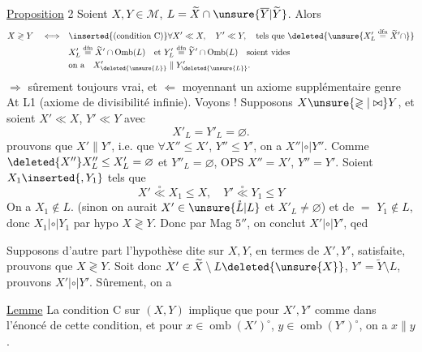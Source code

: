 \uline{Proposition} 2  Soient $X,Y\in\mathcal M$, $L=\widetilde X\cap\unsure{\overline Y|\widetilde Y}$.  Alors
\[
\begin{aligned}
X\gtrless Y\quad\Longleftrightarrow\quad&\inserted{\text{(condition C)}}\forall X'\ll X,\quad Y'\ll Y,\quad\text{tels que }\deleted{\unsure{X'_L\overset{\mathrm{dfn}}{=}\widetilde X'\cap}}\\
&X'_L\overset{\mathrm{dfn}}{=}\widetilde X'\cap\operatorname{Omb}(L)\quad\text{et }Y'_L\overset{\mathrm{dfn}}{=}\widetilde Y'\cap\operatorname{Omb}(L)\quad\text{soient vides}\\
&\text{on a}\quad X'_{\deleted{\unsure{L}}}\parallel Y'_{\deleted{\unsure{L}}}.
\end{aligned}
\]
$\Longrightarrow$ sûrement toujours vrai, et $\Longleftarrow$ moyennant un axiome  supplémentaire genre At L1 (axiome de divisibilité infinie). Voyons !
Supposons $X\unsure{\gtrless|\bowtie}Y$, et soient $X'\ll X$, $Y'\ll Y$ avec
\[
X'_L=Y'_L=\varnothing.
\]
prouvons que $X'\parallel Y'$, i.e.  que  $\forall X''\leq X'$, $Y''\leq Y'$, on a $X''\mathrel{|\circ|}Y''$. Comme $\deleted{X''}X''_L\leq X'_L=\varnothing$ et   $Y''_L=\varnothing$, OPS $X''=X'$, $Y''=Y'$. Soient $X_1\inserted{,Y_1}$ tels que 
\[
X'\overset{\circ}{\ll}X_1\leq X,\quad Y'\overset{\circ}{\ll}Y_1\leq Y
\]
On a $X_1\notin L$. (sinon on aurait $X'\in\unsure{\mathring L|L}$ et $X'_L\ne\varnothing$) et de $=$ $Y_1\notin L$, donc $X_1\mathrel{|\circ|}Y_1$ par hypo $X\gtrless Y$. Donc par Mag $5''$, on conclut $X'\mathrel{|\circ|}Y'$, qed

Supposons d'autre part l'hypothèse dite sur $X,Y$, en termes de $X',Y'$, satisfaite, prouvons que $X\gtrless Y$. Soit donc $X'\in\widetilde X\setminus L\deleted{\unsure{X}}$, $Y'=\widetilde Y\setminus L$, prouvons $X'\mathrel{|\circ|}Y'$.
Sûrement, on a

\margin{$\Vert$}
\uline{Lemme} La condition C sur $(X,Y)$ implique que pour $X',Y'$ comme dans l'énoncé de cette condition, et pour $x\in\operatorname{omb}(X')^{\circ}$, $y\in\operatorname{omb}(Y')^{\circ}$, on a $x\parallel y$.

